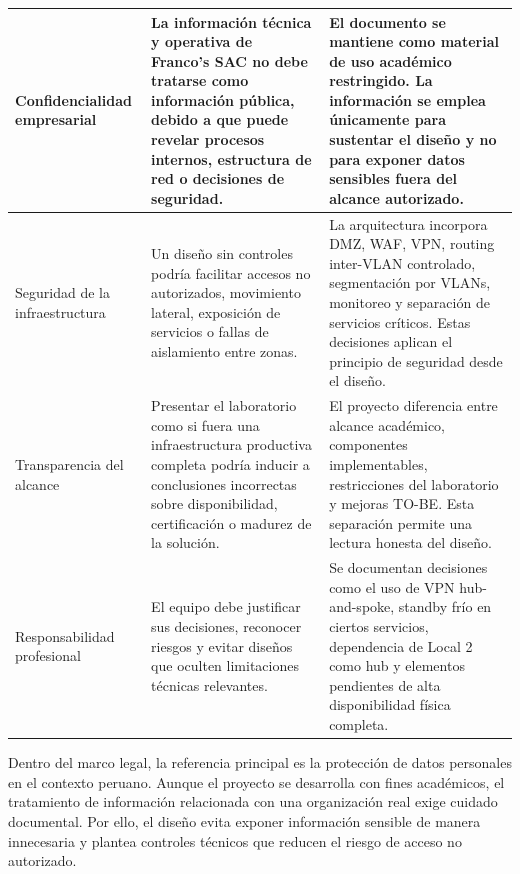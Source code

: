 \documentclass[11pt, a4paper, oneside]{report}
\begin{document}
\begin{xltabular}{\textwidth}{@{}|L{3.2cm}|X|X|@{}}
{\small Confidencialidad empresarial} &
{\small La información técnica y operativa de Franco's SAC no debe tratarse como información pública, debido a que puede revelar procesos internos, estructura de red o decisiones de seguridad.} &
{\small El documento se mantiene como material de uso académico restringido. La información se emplea únicamente para sustentar el diseño y no para exponer datos sensibles fuera del alcance autorizado.} \\ \hline

{\small Seguridad de la infraestructura} &
{\small Un diseño sin controles podría facilitar accesos no autorizados, movimiento lateral, exposición de servicios o fallas de aislamiento entre zonas.} &
{\small La arquitectura incorpora DMZ, WAF, VPN, routing inter-VLAN controlado, segmentación por VLANs, monitoreo y separación de servicios críticos. Estas decisiones aplican el principio de seguridad desde el diseño.} \\ \hline

{\small Transparencia del alcance} &
{\small Presentar el laboratorio como si fuera una infraestructura productiva completa podría inducir a conclusiones incorrectas sobre disponibilidad, certificación o madurez de la solución.} &
{\small El proyecto diferencia entre alcance académico, componentes implementables, restricciones del laboratorio y mejoras TO-BE. Esta separación permite una lectura honesta del diseño.} \\ \hline

{\small Responsabilidad profesional} &
{\small El equipo debe justificar sus decisiones, reconocer riesgos y evitar diseños que oculten limitaciones técnicas relevantes.} &
{\small Se documentan decisiones como el uso de VPN hub-and-spoke, standby frío en ciertos servicios, dependencia de Local 2 como hub y elementos pendientes de alta disponibilidad física completa.} \\ \hline

\end{xltabular}

\normalsize

Dentro del marco legal, la referencia principal es la protección de datos personales en el contexto peruano. Aunque el proyecto se desarrolla con fines académicos, el tratamiento de información relacionada con una organización real exige cuidado documental. Por ello, el diseño evita exponer información sensible de manera innecesaria y plantea controles técnicos que reducen el riesgo de acceso no autorizado.
\end{document}
